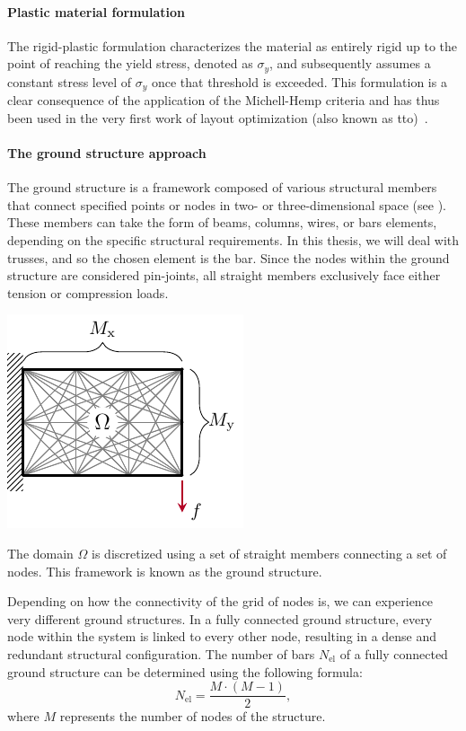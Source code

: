 \paragraph{Plastic material formulation}
The rigid-plastic formulation characterizes the material as entirely rigid up to the point of reaching the yield stress, denoted as $\sigma_y$, and subsequently assumes a constant stress level of $\sigma_y$ once that threshold is exceeded. This formulation is a clear consequence of the application of the Michell-Hemp criteria and has thus been used in the very first work of layout optimization (also known as \gls{tto})~. 

\paragraph{The ground structure approach}
The ground structure is a framework composed of various structural members that connect specified points or nodes in two- or three-dimensional space (see ). These members can take the form of beams, columns, wires, or bars elements, depending on the specific structural requirements. In this thesis, we will deal with trusses, and so the chosen element is the bar. Since the nodes within the ground structure are considered pin-joints, all straight members exclusively face either tension or compression loads. 
\begin{marginfigure}
    \centering
    \includegraphics{figures/03_comparison_TO_TTO/04_disc_mesh/d_mesh.pdf}
    \caption{The domain $\Omega$ is discretized using a set of straight members connecting a set of nodes. This framework is known as the ground structure.}
    \label{fig:03_mesh_d}
\end{marginfigure}

Depending on how the connectivity of the grid of nodes is, we can experience very different ground structures. In a fully connected ground structure, every node within the system is linked to every other node, resulting in a dense and redundant structural configuration. The number of bars $N_{\text{el}}$ of a fully connected ground structure can be determined using the following formula:
\begin{equation}
    N_{\text{el}} = \frac{M \cdot (M-1)}{2},
\end{equation}
where $M$ represents the number of nodes of the structure.

